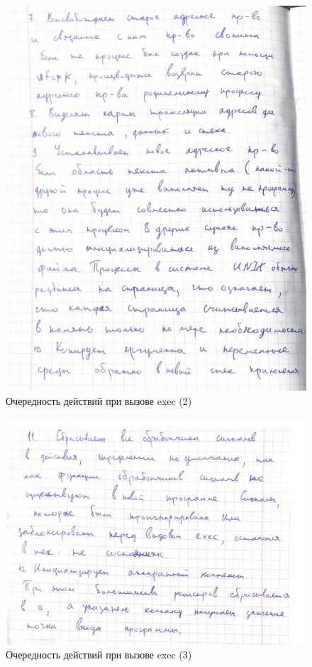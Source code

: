 \documentclass[12pt]{report}
\begin{document}
\begin{figure}[H]

	\centering

	\includegraphics[width=\linewidth]{img/exec_2.png}
	\caption{Очередность действий при вызове exec (2)}

\end{figure}


\begin{figure}[H]

	\centering

	\includegraphics[width=\linewidth]{img/exec_3.png}
	\caption{Очередность действий при вызове exec (3)}

\end{figure}
\end{document}
